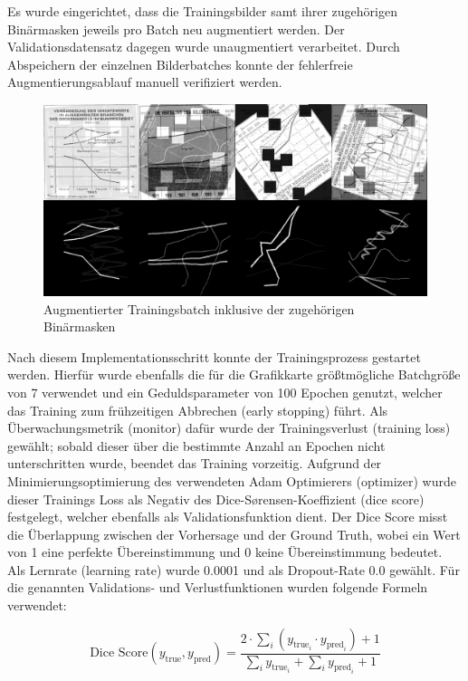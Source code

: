 Es wurde eingerichtet, dass die Trainingsbilder samt ihrer zugehörigen Binärmasken jeweils pro Batch neu augmentiert werden. Der Validationsdatensatz dagegen wurde unaugmentiert verarbeitet. Durch Abspeichern der einzelnen Bilderbatches konnte der fehlerfreie Augmentierungsablauf manuell verifiziert werden.

\begin{figure}[H]
    \centering
    \captionsetup{width=.75\linewidth}
    \includegraphics[width=.75\textwidth]{Implementation/img/unet_training.png}
    \caption{ Augmentierter Trainingsbatch inklusive der zugehörigen Binärmasken}
    \label{fig:unet_training}
\end{figure}

Nach diesem Implementationsschritt konnte der Trainingsprozess gestartet werden. Hierfür wurde ebenfalls die für die Grafikkarte größtmögliche Batchgröße von 7 verwendet und ein Geduldsparameter von 100 Epochen genutzt, welcher das Training zum frühzeitigen Abbrechen (early stopping) führt. Als Überwachungsmetrik (monitor) dafür wurde der Trainingsverlust (training loss) gewählt; sobald dieser über die bestimmte Anzahl an Epochen nicht unterschritten wurde, beendet das Training vorzeitig. Aufgrund der Minimierungsoptimierung des verwendeten Adam Optimierers (optimizer) \cite{kingma2017adammethodstochasticoptimization} wurde dieser Trainings Loss als Negativ des Dice-Sørensen-Koeffizient (dice score) festgelegt, welcher ebenfalls als Validationsfunktion dient. Der Dice Score misst die Überlappung zwischen der Vorhersage und der Ground Truth, wobei ein Wert von 1 eine perfekte Übereinstimmung und 0 keine Übereinstimmung bedeutet. Als Lernrate (learning rate) wurde 0.0001 und als Dropout-Rate 0.0 gewählt. Für die genannten Validations- und Verlustfunktionen wurden folgende Formeln verwendet:

\begin{equation}
    \text{Dice Score}(y_{\text{true}}, y_{\text{pred}}) = \frac{2 \cdot \sum_{i} (y_{\text{true}_i} \cdot y_{\text{pred}_i}) + 1}{\sum_{i} y_{\text{true}_i} + \sum_{i} y_{\text{pred}_i} + 1} \nonumber
\end{equation}

